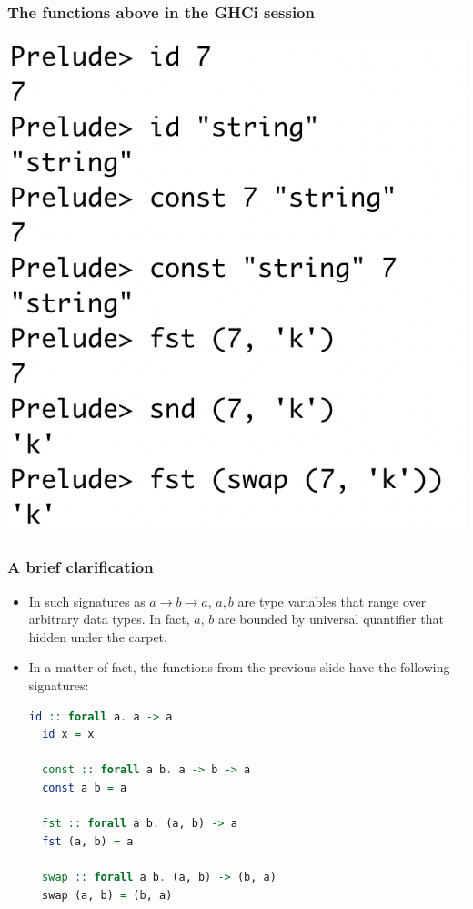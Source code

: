 \documentclass[10pt,pdf,utf8,russian,aspectratio=169]{beamer}
\begin{document}
\begin{frame}
  \frametitle{The functions above in the GHCi session}

  \begin{center}
  \includegraphics[scale=0.5]{Pics/Triv.png}
  \end{center}
\end{frame}

\begin{frame}[fragile]
  \frametitle{A brief clarification}

\begin{itemize}
  \item In such signatures as $a \to b \to a$, $a, b$ are type variables that range over arbitrary data types. In fact, $a$, $b$ are bounded by universal quantifier that hidden under the carpet.
  \item In a matter of fact, the functions from the previous slide have the following signatures:
  \begin{lstlisting}[language=Haskell]
  id :: forall a. a -> a
  id x = x

  const :: forall a b. a -> b -> a
  const a b = a

  fst :: forall a b. (a, b) -> a
  fst (a, b) = a

  swap :: forall a b. (a, b) -> (b, a)
  swap (a, b) = (b, a)
  \end{lstlisting}
\end{itemize}
\end{frame}
\end{document}
